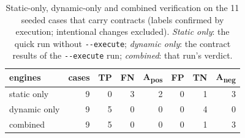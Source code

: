 \begin{table}[t]
\centering
\footnotesize
\setlength{\tabcolsep}{4pt}
\caption{Static-only, dynamic-only and combined verification on the 11 seeded cases that carry contracts (labels confirmed by execution; intentional changes excluded). \emph{Static only}: the quick run without \texttt{-{}-execute}; \emph{dynamic only}: the contract results of the \texttt{-{}-execute} run; \emph{combined}: that run's verdict.}
\label{tab:engines}
\begin{tabular}{lrrrrrrr}
\toprule
engines & cases & TP & FN & A\textsubscript{pos} & FP & TN & A\textsubscript{neg} \\
\midrule
static only & 9 & 0 & 3 & 2 & 0 & 1 & 3 \\
dynamic only & 9 & 5 & 0 & 0 & 0 & 4 & 0 \\
combined & 9 & 5 & 0 & 0 & 0 & 1 & 3 \\
\bottomrule
\end{tabular}
\end{table}

